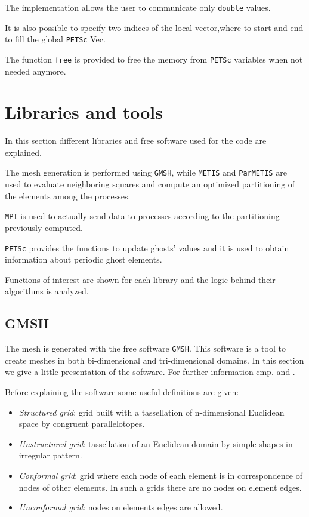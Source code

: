The implementation allows the user to communicate only \verb|double| values.

It is also possible to specify two indices of the local vector,where to start and end to fill the global \verb|PETSc| Vec.

The function \verb|free| is provided to free the memory from \verb|PETSc| variables when not needed anymore.

\section{Libraries and tools}\label{section:lib}
In this section different libraries and free software used for the code are explained.

The mesh generation is performed using \verb|GMSH|, while \verb|METIS| and \verb|ParMETIS| are used to evaluate neighboring squares and compute an optimized partitioning of the elements among the processes.

\verb|MPI| is used to actually send data to processes according to the partitioning previously computed.

\verb|PETSc| provides the functions to update ghosts' values and it is used to obtain information about periodic ghost elements.

Functions of interest are shown for each library and the logic behind their algorithms is analyzed.

\subsection{GMSH}\label{subsection:gmsh}
The mesh is generated with the free software \verb|GMSH|. This software is a tool to create meshes in both bi-dimensional and tri-dimensional domains. In this section we give a little presentation of the software. For further information cmp. \cite{gmsh_man} and \cite{gmsh_art}.

Before explaining the software some useful definitions are given:

\begin{itemize}
\item \textit{Structured grid}: grid built with a tassellation of n-dimensional Euclidean space by congruent parallelotopes\cite{wolfram_struct}.
\item \textit{Unstructured grid}: tassellation of an Euclidean domain by simple shapes in irregular pattern.
\item \textit{Conformal grid}: grid where each node of each element is in correspondence of nodes of other elements. In such a grids there are no nodes on element edges.
\item \textit{Unconformal grid}: nodes on elements edges are allowed.
\end{itemize}

